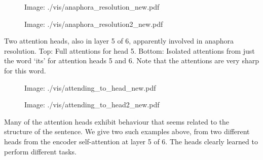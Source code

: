 \documentclass[11pt,a4paper]{article}
\begin{document}
\begin{figure}[h]
\caption{Image: ./vis/anaphora\_resolution\_new.pdf}
\end{figure}

\begin{figure}[h]
\caption{Image: ./vis/anaphora\_resolution2\_new.pdf}
\end{figure}

Two attention heads, also in layer 5 of 6, apparently involved in anaphora resolution. Top: Full attentions for head 5. Bottom: Isolated attentions from just the word `its' for attention heads 5 and 6. Note that the attentions are very sharp for this word.

\begin{figure}[h]
\caption{Image: ./vis/attending\_to\_head\_new.pdf}
\end{figure}

\begin{figure}[h]
\caption{Image: ./vis/attending\_to\_head2\_new.pdf}
\end{figure}

Many of the attention heads exhibit behaviour that seems related to the structure of the sentence. We give two such examples above, from two different heads from the encoder self-attention at layer 5 of 6. The heads clearly learned to perform different tasks.
\end{document}
